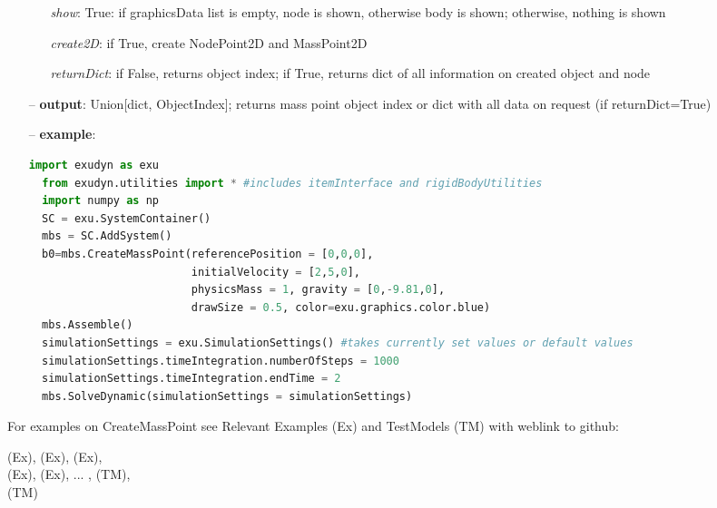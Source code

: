 \begin{itemize}[leftmargin=0.7cm]
\begin{itemize}[leftmargin=1.2cm]
\item[]{\it show}: True: if graphicsData list is empty, node is shown, otherwise body is shown; otherwise, nothing is shown
\item[]{\it create2D}: if True, create NodePoint2D and MassPoint2D
\item[]{\it returnDict}: if False, returns object index; if True, returns dict of all information on created object and node
\end{itemize}
\item[--]
{\bf output}: Union[dict, ObjectIndex]; returns mass point object index or dict with all data on request (if returnDict=True)
\item[--]
{\bf example}: \vspace{-12pt}\ei\begin{lstlisting}[language=Python, xleftmargin=36pt]
  import exudyn as exu
  from exudyn.utilities import * #includes itemInterface and rigidBodyUtilities
  import numpy as np
  SC = exu.SystemContainer()
  mbs = SC.AddSystem()
  b0=mbs.CreateMassPoint(referencePosition = [0,0,0],
                         initialVelocity = [2,5,0],
                         physicsMass = 1, gravity = [0,-9.81,0],
                         drawSize = 0.5, color=exu.graphics.color.blue)
  mbs.Assemble()
  simulationSettings = exu.SimulationSettings() #takes currently set values or default values
  simulationSettings.timeIntegration.numberOfSteps = 1000
  simulationSettings.timeIntegration.endTime = 2
  mbs.SolveDynamic(simulationSettings = simulationSettings)
\end{lstlisting}\vspace{-24pt}\bi\item[]\vspace{-24pt}\vspace{12pt}\end{itemize}
%

%
\noindent For examples on CreateMassPoint see Relevant Examples (Ex) and TestModels (TM) with weblink to github:
\bi
 \item \footnotesize {} (Ex), 
 (Ex), 
 (Ex), 
\\  (Ex), 
 (Ex), 
 ...
, 
 (TM), 
\\  (TM)
\ei

